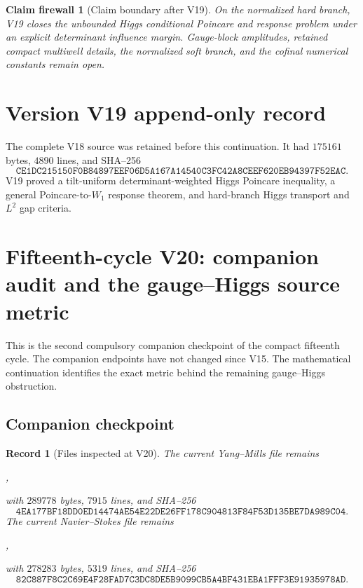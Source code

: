 \documentclass[11pt]{article}
\newtheorem{firewall}[theorem]{Claim firewall}
\newtheorem{record}[theorem]{Record}
\theoremstyle{remark}
\begin{document}
\begin{firewall}[Claim boundary after V19]
\label{fire:v15v19}
On the normalized hard branch, V19 closes the unbounded Higgs
conditional Poincare and response problem under an explicit
determinant influence margin.  Gauge-block amplitudes, retained
compact multiwell details, the normalized soft branch, and the
cofinal numerical constants remain open.
\end{firewall}

\section*{Version V19 append-only record}
The complete V18 source was retained before this continuation.  It
had \(175161\) bytes, \(4890\) lines, and SHA--256
\[
 \texttt{CE1DC215150F0B84897EEF06D5A167A14540C3FC42A8CEEF620EB94397F52EAC}.
\]
V19 proved a tilt-uniform determinant-weighted Higgs Poincare
inequality, a general Poincare-to-\(W_1\) response theorem, and
hard-branch Higgs transport and \(L^2\) gap criteria.
\section{Fifteenth-cycle V20: companion audit and the gauge--Higgs source metric}
\label{sec:v15v20}

This is the second compulsory companion checkpoint of the compact
fifteenth cycle.  The companion endpoints have not changed since
V15.  The mathematical continuation identifies the exact metric
behind the remaining gauge--Higgs obstruction.

\subsection{Companion checkpoint}

\begin{record}[Files inspected at V20]
\label{rec:v15v20-companions}
The current Yang--Mills file remains
\begin{center}
,
\end{center}
with \(289778\) bytes, \(7915\) lines, and SHA--256
\[
 \texttt{4EA177BF18DD0ED14474AE54E22DE26FF178C904813F84F53D135BE7DA989C04}.
                                                               \tag{20.1}
\]
The current Navier--Stokes file remains
\begin{center}
,
\end{center}
with \(278283\) bytes, \(5319\) lines, and SHA--256
\[
 \texttt{82C887F8C2C69E4F28FAD7C3DC8DE5B9099CB5A4BF431EBA1FFF3E91935978AD}.
                                                               \tag{20.2}
\]
\end{record}
\end{document}
